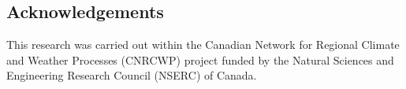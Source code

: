 \documentclass[a0,landscape]{a0poster}
\begin{document}
\begin{multicols*}{3}
\nocite{*} %
\small

\section*{Acknowledgements}
\small
This research was carried out within the Canadian Network for Regional Climate and Weather Processes (CNRCWP) project funded by the Natural Sciences and Engineering Research Council (NSERC) of Canada.

\end{multicols*}
\end{document}
